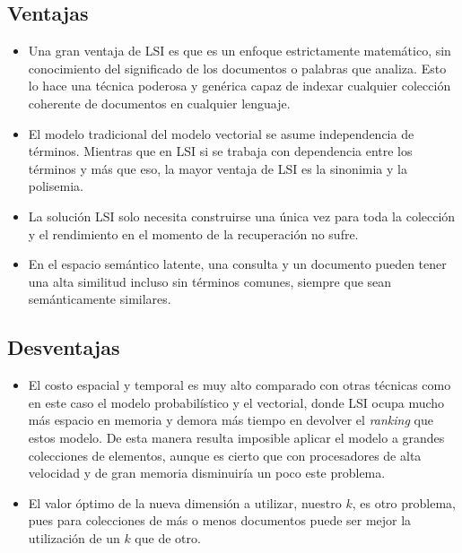 \documentclass[spanish]{article}
\begin{document}
\subsection*{Ventajas}
 
\begin{itemize}
 \item Una gran ventaja de LSI es que es un enfoque estrictamente matemático, sin conocimiento del significado de los documentos o palabras que analiza. Esto lo hace una técnica poderosa y genérica capaz de indexar cualquier colección coherente de documentos en cualquier lenguaje. 

\item  El modelo tradicional del modelo vectorial se asume independencia de términos. Mientras que en LSI si se trabaja con dependencia entre los términos y más que eso, la mayor ventaja de LSI es la sinonimia y la polisemia.

\item La solución LSI solo necesita construirse una única vez para toda la colección y el rendimiento en el momento de la recuperación no sufre. 

\item En el espacio semántico latente, una consulta y un documento pueden tener una alta similitud incluso sin términos comunes, siempre que sean semánticamente similares.


\end{itemize}

\subsection*{Desventajas}

\begin{itemize}
 \item El costo espacial y temporal es muy alto comparado con otras técnicas como en este caso el modelo probabilístico y el vectorial, donde LSI ocupa mucho más espacio en memoria y demora más tiempo en devolver el \emph{ranking} que estos modelo. De esta manera resulta imposible aplicar el modelo a grandes colecciones de elementos, aunque es cierto que con procesadores de alta velocidad y de gran memoria disminuiría un poco este problema.
 
\item El valor óptimo de la nueva dimensión a utilizar, nuestro $ k $, es otro problema, pues para colecciones de más o menos documentos puede ser mejor la utilización de un $ k $ que de otro.
 
\end{itemize}
\end{document}
